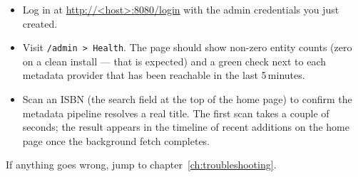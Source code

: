 \begin{itemize}
  \item Log in at \url{http://<host>:8080/login} with the admin
        credentials you just created.
  \item Visit \texttt{/admin > Health}. The page should show
        non-zero entity counts (zero on a clean install — that is
        expected) and a green check next to each metadata provider
        that has been reachable in the last 5\,minutes.
  \item Scan an ISBN (the search field at the top of the home page)
        to confirm the metadata pipeline resolves a real title. The
        first scan takes a couple of seconds; the result appears in
        the timeline of recent additions on the home page once the
        background fetch completes.
\end{itemize}

If anything goes wrong, jump to chapter~\ref{ch:troubleshooting}.
